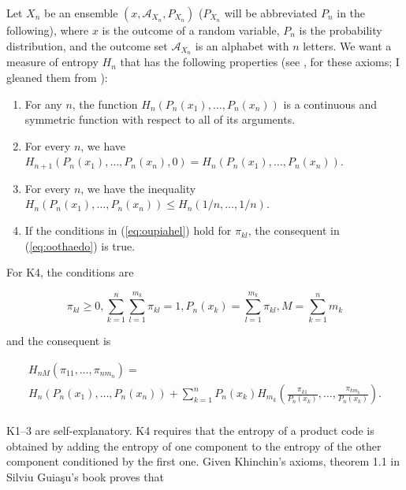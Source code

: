\documentclass[phd,12pt,oneside]{ubcthesis}
\begin{document}
Let $X_{n}$ be an ensemble $(x,\mathcal{A}_{X_{n}},P_{X_{n}})$
($P_{X_{n}}$ will be abbreviated $P_{n}$ in the following), where $x$
is the outcome of a random variable, $P_{n}$ is the probability
distribution, and the outcome set $\mathcal{A}_{X_{n}}$ is an alphabet
with $n$ letters. We want a measure of entropy $H_{n}$ that has the
following properties (see , for these axioms; I
gleaned them from ):

\begin{enumerate}[(K1)]
\item For any $n$, the function
  $H_{n}(P_{n}(x_{1}),\ldots,P_{n}(x_{n}))$ is a continuous and
  symmetric function with respect to all of its arguments.
\item For every $n$, we have
  $H_{n+1}(P_{n}(x_{1}),\ldots,P_{n}(x_{n}),0)=H_{n}(P_{n}(x_{1}),\ldots,P_{n}(x_{n}))$.
\item For every $n$, we have the inequality
  $H_{n}(P_{n}(x_{1}),\ldots,P_{n}(x_{n}))\leq{}H_{n}(1/n,\dots,1/n)$.
\item If the conditions in (\ref{eq:oupiahel}) hold for $\pi_{kl}$, the consequent in
  (\ref{eq:oothaedo}) is true.
\end{enumerate}

{\noindent}For K4, the conditions are

\begin{equation}
  \label{eq:oupiahel}
  \pi_{kl}\geq{}0,\sum_{k=1}^{n}\sum_{l=1}^{m_{k}}\pi_{kl}=1,P_{n}(x_{k})=\sum_{l=1}^{m_{k}}\pi_{kl},M=\sum_{k=1}^{n}m_{k}
\end{equation}

{\noindent}and the consequent is

\begin{equation}
  \label{eq:oothaedo}
  \begin{array}{l}
    \displaystyle H_{nM}(\pi_{11},\ldots,\pi_{nm_{n}})= \\
    \displaystyle H_{n}(P_{n}(x_{1}),\ldots,P_{n}(x_{n}))+\sum_{k=1}^{n}P_{n}(x_{k})H_{m_{k}}\left(\frac{\pi_{k1}}{P_{n}(x_{k})},\ldots,\frac{\pi_{km_{k}}}{P_{n}(x_{k})}\right). \\
  \end{array}
\end{equation}

K1--3 are self-explanatory. K4 requires that the entropy of a product
code is obtained by adding the entropy of one component to the entropy
of the other component conditioned by the first one. Given Khinchin's
axioms, theorem 1.1 in Silviu Guia{\c{s}}u's book proves that 
\end{document}
